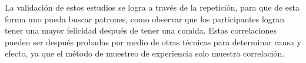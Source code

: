 La validación de estos estudios se logra a través de la repetición, para que de esta forma uno pueda buscar patrones, como observar que los participantes logran tener una mayor felicidad después de tener una comida. Estas correlaciones pueden ser después probadas por medio de otras técnicas para determinar causa y efecto, ya que el método de muestreo de experiencia solo muestra correlación.

